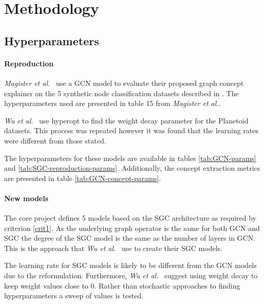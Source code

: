 \section{Methodology}

\subsection{Hyperparameters}
\label{sec:hyperparameters}

\paragraph{Reproduction}
\textit{Magister et al.}~\cite{magister2021gcexplainer} use a GCN model to evaluate their proposed graph concept explainer on the 5 synthetic node classification datasets described in .
The hyperparameters used are presented in table 15 from \textit{Magister et al.}. 

\textit{Wu et al.}~\cite{wu2019simplifying} use hyperopt to find the weight decay parameter for the Planetoid\cite{kipf2016semi} datasets.
This process was repeated however it was found that the learning rates were different from those stated.

The hyperparameters for these models are available in tables \ref{tab:GCN-params} and \ref{tab:SGC-reproduction-params}.
Additionally, the concept extraction metrics are presented in table \ref{tab:GCN-concept-params}.

%
%
%

\paragraph{New models}
The core project defines 5 models based on the SGC architecture as required by criterion \ref{crit1}.
As the underlying graph operator is the same for both GCN and SGC the degree of the SGC model is the same as the number of layers in GCN.
This is the approach that \textit{Wu et al.}~\cite{wu2019simplifying} use to create their SGC models.

The learning rate for SGC models is likely to be different from the GCN models due to the reformulation.
Furthermore, \textit{Wu et al.}~\cite{wu2019simplifying} suggest using weight decay to keep weight values close to $0$.
Rather than stochastic approaches to finding hyperparameters a sweep of values is tested.

